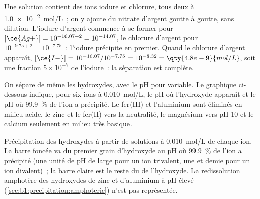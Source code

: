 \begin{example}\label{ex:b1:precipitation:i-cl}
Une solution contient des ions iodure et chlorure, tous deux à
\qty{1.0e-2}{mol/L}~; on y ajoute du nitrate d'argent goutte à goutte,
sans dilution. L'iodure d'argent commence à se former pour
$[\ce{Ag+}] = 10^{-16.07 + 2} =
10^{-14.07}$, le chlorure d'argent pour $10^{-9.75 + 2} = 10^{-7.75}$~:
l'iodure précipite en premier. Quand le chlorure d'argent apparaît,
$[\ce{I-}] = 10^{-16.07}/10^{-7.75} = 10^{-8.32} = \qty{4.8e-9}{mol/L}$,
soit une fraction $5 \times 10^{-7}$ de l'iodure~: la séparation est
complète.
\end{example}

On sépare de même les hydroxydes, avec le pH pour variable. Le
graphique ci-dessous indique, pour six ions à \qty{0.010}{mol/L}, le pH
où l'hydroxyde apparaît et le pH où \qty{99.9}{\percent} de l'ion a
précipité. Le fer(III) et l'aluminium sont éliminés en milieu acide, le
zinc et le fer(II) vers la neutralité, le magnésium vers pH 10 et le
calcium seulement en milieu très basique.

\begin{omfigure}

{\small Précipitation des hydroxydes à partir de solutions à
\qty{0.010}{mol/L} de chaque ion. La barre foncée va du premier grain
d'hydroxyde au pH où \qty{99.9}{\percent} de l'ion a précipité (une
unité de pH de large pour un ion trivalent, une et demie pour un ion
divalent)~; la barre claire est le reste du  de
l'hydroxyde. La redissolution amphotère des hydroxydes de zinc et
d'aluminium à pH élevé (\cref{sec:b1:precipitation:amphoteric}) n'est
pas représentée.}
\end{omfigure}

